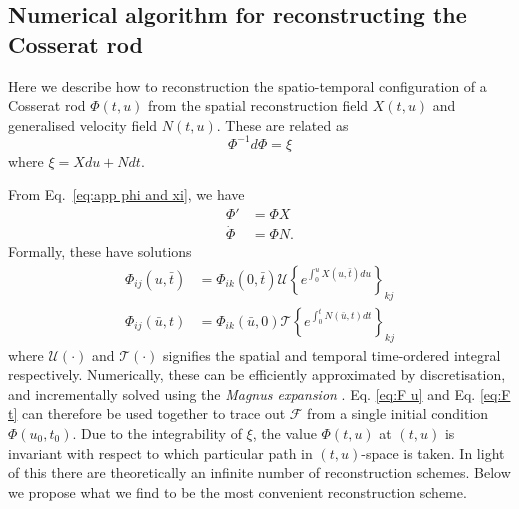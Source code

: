 \documentclass[withindex,glossary,techreport]{cam-thesis}
\begin{document}
\begin{appendices}
\section{Numerical algorithm for reconstructing the Cosserat rod} \label{app:Reconstructing the Cosserat rod from xi}

Here we describe how to reconstruction the spatio-temporal configuration of a Cosserat rod $\Phi(t,u)$ from the spatial reconstruction field $X(t,u)$ and generalised velocity field $N(t,u)$. These are related as
\begin{equation} \label{eq:app phi and xi}
	\Phi^{-1} d \Phi = \xi
\end{equation}
where $\xi = X du + N dt$.

From Eq.~\ref{eq:app phi and xi}, we have
\begin{subequations} 
\begin{align}
\Phi' & =  \Phi X \label{eq:F u} \\
\dot{\Phi} & = \Phi  N \label{eq:F t}.
\end{align}
\end{subequations}
Formally, these have solutions
\begin{subequations} 
\begin{align}
\Phi_{ij}(u, \bar{t}) & = \Phi_{ik}(0, \bar{t}) \mathscr{U} \left\{ e^{ \int_0^u X(u, \bar{t}) du } \right\}_{kj} \\
\Phi_{ij}(\bar{u}, t) & = \Phi_{ik}(\bar{u}, 0) \mathscr{T} \left\{ e^{ \int_0^t N(\bar{u}, t) dt } \right\}_{kj}
\end{align}
\end{subequations}
where $\mathscr{U}(\cdot)$ and $\mathscr{T}(\cdot)$ signifies the spatial and temporal time-ordered integral respectively. Numerically, these can be efficiently approximated by discretisation, and incrementally solved using the \textit{Magnus expansion} \citep{magnusExponentialSolutionDifferential1954}. Eq. \ref{eq:F u} and Eq. \ref{eq:F t}
can therefore be used together to trace out $\mathcal{F}$
from a single initial condition $\Phi(u_{0}, t_{0})$. Due to
the integrability of $\xi$, the value $\Phi(t, u)$ at $(t, u)$ is invariant with respect to which particular path
in $(t, u)$-space is taken. In light of this there are theoretically
an infinite number of reconstruction schemes. Below we propose what
we find to be the most convenient reconstruction scheme.


\end{appendices}
\end{document}
